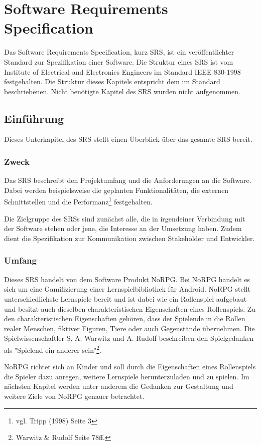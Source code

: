 \chapter{Software Requirements Specification}
	Das Software Requirements Specification, kurz SRS, ist ein veröffentlichter Standard zur Spezifikation einer Software. Die Struktur eines SRS ist vom Institute of Electrical and Electronics Engineers im Standard IEEE 830-1998 festgehalten. Die Struktur dieses Kapitels entspricht dem im Standard beschriebenen. Nicht benötigte Kapitel des SRS wurden nicht aufgenommen.
	
\section{Einführung}
	Dieses Unterkapitel des SRS stellt einen Überblick über das gesamte SRS bereit.
	
	\subsection{Zweck}
		Das SRS beschreibt den Projektumfang und die Anforderungen an die Software. Dabei werden beispielsweise die geplanten Funktionalitäten, die externen Schnittstellen und die Performanz\footnote{vgl. Tripp \cite{srsIEEE}(1998) Seite 3} festgehalten. 
	
		Die Zielgruppe des SRSs sind zunächst alle, die in irgendeiner Verbindung mit der Software stehen oder jene, die Interesse an der Umsetzung haben. Zudem dient die Spezifikation zur Kommunikation zwischen Stakeholder und Entwickler.
		
	\subsection{Umfang}
		Dieses SRS handelt von dem Software Produkt NoRPG. Bei NoRPG handelt es sich um eine Gamifizierung einer Lernspielbibliothek für Android. NoRPG stellt unterschiedlichste Lernspiele bereit und ist dabei wie ein Rollenspiel aufgebaut und besitzt auch dieselben charakteristischen Eigenschaften eines Rollenspiels. Zu den charakteristischen Eigenschaften gehören, dass der Spielende in die Rollen realer Menschen, fiktiver Figuren, Tiere oder auch Gegenstände übernehmen. Die Spielwissenschaftler S. A. Warwitz und A. Rudolf beschreiben den Spielgedanken als "Spielend ein anderer sein"\footnote{Warwitz & Rudolf \cite{rpgSinn} Seite 78ff.}.
		
		NoRPG richtet sich an Kinder und soll durch die Eigenschaften eines Rollenspiels die Spieler dazu anregen, weitere Lernspiele herunterzuladen und zu spielen. Im nächsten Kapitel werden unter anderem die Gedanken zur Gestaltung und weitere Ziele von NoRPG genauer betrachtet.
		
